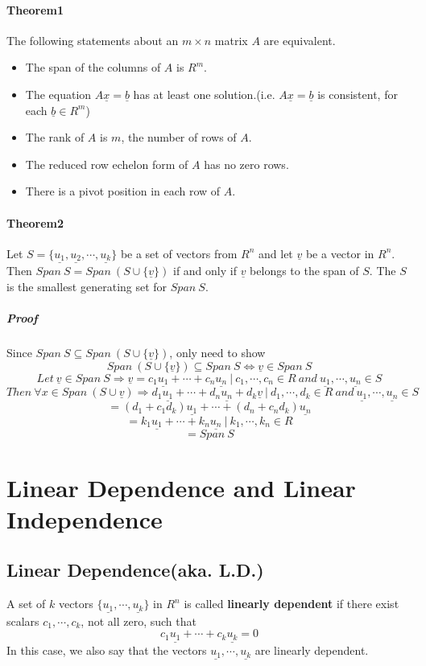 \documentclass[12pt]{article}
\begin{document}
\paragraph{Theorem1}
The following statements about an $m\times n$ matrix $A$ are equivalent.
\begin{itemize}
\item The span of the columns of $A$ is $R^m$.
\item The equation $A\underline{x}=\underline{b}$ has at least one solution.(i.e. $A\underline{x}=\underline{b}$ is consistent, for each $\underline{b} \in R^m$)
\item The rank of $A$ is $m$, the number of rows of $A$.
\item The reduced row echelon form of $A$ has no zero rows.
\item There is a pivot position in each row of $A$.
\end{itemize}
\paragraph{Theorem2}
Let $S=\lbrace \underline{u_1},\underline{u_2},\cdots,\underline{u_k}\rbrace$ be a set of vectors from $R^n$ and let $\underline{v}$ be a vector in $R^n$. Then $Span\ S = Span\ (S \cup \lbrace \underline{v}\rbrace)$ if and only if $\underline{v}$ belongs to the span of $S$. The $S$ is the smallest generating set for $Span\ S$.
\subparagraph{Proof}
Since $Span\ S \subseteq Span\ (S\cup \lbrace\underline{v}\rbrace)$, only need to show $$Span\ (S\cup \lbrace\underline{v}\rbrace) \subseteq Span\ S \Leftrightarrow \underline{v} \in Span\ S$$
$$
Let\ \underline{v} \in Span\ S \Rightarrow \underline{v} = c_1\underline{u_1}+\cdots+c_n\underline{u_n}\ |\ c_1,\cdots,c_n \in R\ and\ \underline{u_1},\cdots,\underline{u_n} \in S
$$
$$
Then\ \forall x \in Span\ (S \cup \underline{v}) \Rightarrow d_1\underline{u_1}+\cdots+d_n\underline{u_n}+d_k\underline{v}\ |\ d_1,\cdots,d_k \in R\ and\ \underline{u_1},\cdots,\underline{u_n} \in S
$$
$$
=(d_1+c_1d_k)\underline{u_1}+\cdots+(d_n+c_nd_k)\underline{u_n}
$$
$$
=k_1\underline{u_1} + \cdots + k_n\underline{u_n}\ |\ k_1,\cdots,k_n \in R
$$
$$
= Span\ S
$$

\section{Linear Dependence and Linear Independence}
\subsection{Linear Dependence(aka. L.D.)}
A set of $k$ vectors $\lbrace \underline{u_1}, \cdots ,\underline{u_k}\rbrace$ in $R^n$ is called \textbf{linearly dependent} if there exist scalars $c_1, \cdots, c_k$, not all zero, such that
$$
c_1\underline{u_1} + \cdots + c_k\underline{u_k} = 0
$$
In this case, we also say that the vectors $\underline{u_1}, \cdots ,\underline{u_k}$ are linearly dependent.
\end{document}
